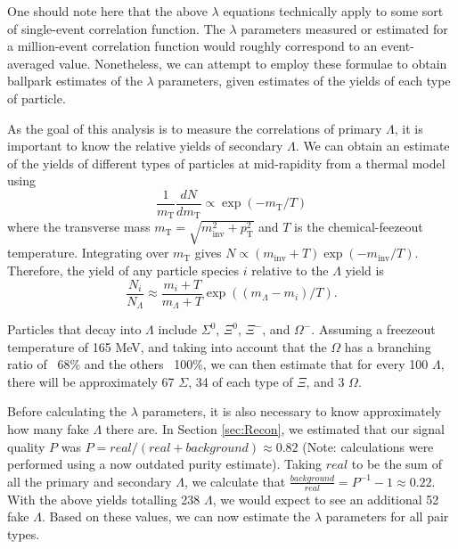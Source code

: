 One should note here that the above $\lambda$ equations technically apply to some sort of single-event correlation function.  The $\lambda$ parameters measured or estimated for a million-event correlation function would roughly correspond to an event-averaged value.  Nonetheless, we can attempt to employ these formulae to obtain ballpark estimates of the $\lambda$ parameters, given estimates of the yields of each type of particle.

As the goal of this analysis is to measure the correlations of primary $\Lambda$, it is important to know the relative yields of secondary $\Lambda$.  We can obtain an estimate \cite{Florkowski:2010zz} of the yields of different types of particles at mid-rapidity from a thermal model using
\begin{equation}
\frac{1}{m_{\mathrm{T}}}\frac{dN}{dm_{\mathrm{T}}} \propto \exp{(-m_\mathrm{T}/T)}
\end{equation}
where the transverse mass $m_\mathrm{T} = \sqrt{m^2_{\mathrm{inv}} + p^2_{\mathrm{T}}}$ and $T$ is the chemical-feezeout temperature.  Integrating over $m_\mathrm{T}$ gives $N \propto (m_\mathrm{inv} + T) \exp{(-m_\mathrm{inv}/T)}$.  Therefore, the yield of any particle species $i$ relative to the $\Lambda$ yield is
\begin{equation}
\frac{N_i}{N_\Lambda} \approx \frac{m_i + T}{m_\Lambda + T} \exp{((m_\Lambda - m_i)/T)}.
\end{equation}

Particles that decay into $\Lambda$ include $\Sigma^0$, $\Xi^0$, $\Xi^-$, and $\Omega^-$.  Assuming a freezeout temperature of 165 MeV, and taking into account that the $\Omega$ has a branching ratio of ~68\% and the others ~100\%, we can then estimate that for every 100 $\Lambda$, there will be approximately 67 $\Sigma$, 34 of each type of $\Xi$, and 3 $\Omega$.

Before calculating the $\lambda$ parameters, it is also necessary to know approximately how many fake $\Lambda$ there are.  In Section \ref{sec:Recon}, we estimated that our signal quality $P$ was $P = real/(real + background) \approx 0.82$ (Note: calculations were performed using a now outdated purity estimate).  Taking $real$ to be the sum of all the primary and secondary $\Lambda$, we calculate that $\frac{background}{real} = P^{-1}-1 \approx 0.22$.  With the above yields totalling 238 $\Lambda$, we would expect to see an additional 52 fake $\Lambda$.  Based on these values, we can now estimate the $\lambda$ parameters for all pair types.

